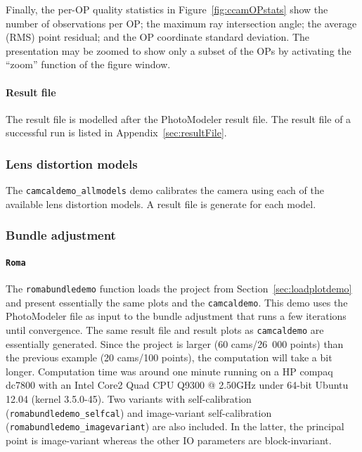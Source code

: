 \documentclass{article}
\begin{document}
Finally, the per-OP quality statistics in Figure~\ref{fig:ccamOPstats}
show the number of observations per OP; the maximum ray intersection
angle; the average (RMS) point residual; and the OP coordinate
standard deviation. The presentation may be zoomed to show only a
subset of the OPs by activating the ``zoom'' function of the figure
window.

\paragraph{Result file}
\label{sec:org5d7e7cc}

The result file is modelled after the PhotoModeler result file. The
result file of a successful run is listed in
Appendix~\ref{sec:resultFile}.

\subsubsection{Lens distortion models}
\label{sec:orgcfa7e53}

The \texttt{camcaldemo\_allmodels} demo calibrates the camera using
each of the available lens distortion models. A result file is
generate for each model.

\subsubsection{Bundle adjustment}
\label{sec:org14b1bbd}

\paragraph{\texttt{Roma}}
\label{sec:orga0d2c8c}
\sloppy The \texttt{romabundledemo} function loads the project from
Section~\ref{sec:loadplotdemo} and present essentially the same plots and
the \texttt{camcaldemo}. This demo uses the PhotoModeler file as input
to the bundle adjustment that runs a few iterations until convergence.
The same result file and result plots as \texttt{camcaldemo} are
essentially generated. Since the project is larger (60 cams/26~000
points) than the previous example (20 cams/100 points), the
computation will take a bit longer. Computation time was around one
minute running on a HP compaq dc7800 with an Intel Core2 Quad CPU
Q9300 @ 2.50GHz under 64-bit Ubuntu 12.04 (kernel 3.5.0-45). Two
variants with self-calibration (\texttt{romabundledemo\_selfcal}) and
image-variant self-calibration (\texttt{romabundledemo\_imagevariant})
are also included. In the latter, the principal point is image-variant
whereas the other IO parameters are block-invariant.
\end{document}
